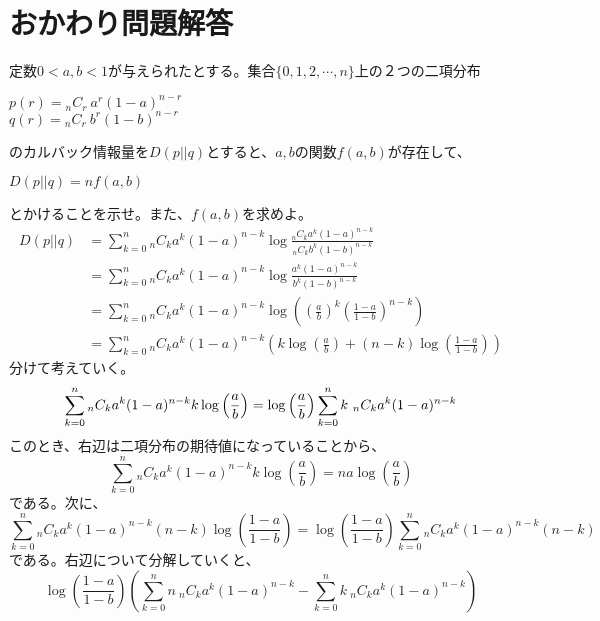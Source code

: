 \documentclass[a4j,uplatex,dvipdfmx]{jsarticle}
\begin{document}
\section*{おかわり問題解答}
定数$0<a,b<1$が与えられたとする。集合$\{ 0,1,2,\cdots ,n \}$上の２つの二項分布
\begin{center}
  $p(r) = {}_nC_r~a^r (1-a)^{n-r}$\\
  $q(r) = {}_nC_r~b^r (1-b)^{n-r}$\\
\end{center}
のカルバック情報量を$D(p||q)$とすると、$a,b$の関数$f(a,b)$が存在して、
\begin{center}
  $D(p||q)=nf(a,b)$
\end{center}
とかけることを示せ。また、$f(a,b)$を求めよ。\\
\begin{equation}
  \begin{split}
    D(p||q) &= \sum_{k=0}^n {}_nC_k a^k (1-a)^{n-k} \log{\frac{{}_nC_k a^k (1-a)^{n-k}}{{}_nC_k b^k (1-b)^{n-k}}} \\ 
    &=\sum_{k=0}^n {}_nC_k a^k (1-a)^{n-k} \log{\frac{ a^k (1-a)^{n-k}}{ b^k (1-b)^{n-k}}} \\
    &= \sum_{k=0}^n {}_nC_k a^k (1-a)^{n-k} \log \left( {\left(\frac{a}{b} \right)^k \left(\frac{1-a}{1-b}\right)^{n-k}} \right) \\ 
    &=\sum_{k=0}^n {}_nC_k a^k (1-a)^{n-k} \left(k \log \left( \frac{a}{b} \right) + (n-k)\log \left( \frac{1-a}{1-b} \right) \right)
  \end{split}
\end{equation}
分けて考えていく。
\begin{equation}
    \sum_{k=0}^n {}_nC_k a^k (1-a)^{n-k} k \log \left( \frac{a}{b} \right) = \log \left( \frac{a}{b} \right) \sum_{k=0}^n k~{}_nC_k a^k (1-a)^{n-k} \\
\end{equation}
このとき、右辺は二項分布の期待値になっていることから、
\begin{equation}
  \sum_{k=0}^n {}_nC_k a^k (1-a)^{n-k} k \log \left( \frac{a}{b} \right) = na\log \left( \frac{a}{b} \right)
\end{equation}
である。次に、
\begin{equation}
  \sum_{k=0}^n {}_nC_k a^k (1-a)^{n-k}(n-k)\log \left( \frac{1-a}{1-b} \right) =\log \left( \frac{1-a}{1-b} \right) \sum_{k=0}^n {}_nC_k a^k (1-a)^{n-k}(n-k)
\end{equation}
である。右辺について分解していくと、
\begin{equation}
  \log \left( \frac{1-a}{1-b} \right) \left( \sum_{k=0}^n n~{}_nC_k a^k (1-a)^{n-k} - \sum_{k=0}^n k~{}_nC_k a^k (1-a)^{n-k} \right)
\end{equation}
\end{document}
